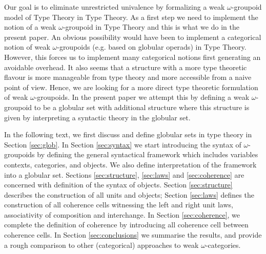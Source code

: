 Our goal is to eliminate unrestricted univalence by formalizing a weak
$\omega$-groupoid model of Type Theory in Type Theory.  As a first
step we need to implement the notion of a weak $\omega$-groupoid in
Type Theory and this is what we do in the present paper.  An obvious
possibility would have been to implement a categorical notion of weak
$\omega$-groupoids (e.g. based on globular operads) in Type
Theory. However, this forces us to implement many categorical notions
first generating an avoidable overhead. It also seems that a structure
with a more type theoretic flavour is more manageable from type theory
and more accessible from a naive point of view. Hence, we are looking
for a more direct type theoretic formulation of weak
$\omega$-groupoids. In the present paper we attempt this by defining a
weak $\omega$-groupoid to be a globular set with additional structure
where this structure is given by interpreting a syntactic theory in
the globular set.

In the following text, we first discuss and define globular sets in
type theory in Section \ref{sec:glob}. In Section \ref{sec:syntax} we
start introducing the syntax of $\omega$-groupoids by defining the general
syntactical framework which includes variables contexts, categories,
and objects. We also define interpretation of the framework into a
globular set. Sections \ref{sec:structure}, \ref{sec:laws} and
\ref{sec:coherence} are concerned with definition of the syntax of
objects. Section \ref{sec:structure} describes the construction of all
units and objects; Section \ref{sec:laws} defines the construction of
all coherence cells witnessing the left and right unit laws,
associativity of composition and interchange. In Section
\ref{sec:coherence}, we complete the definition of coherence by
introducing all coherence cell between coherence cells. In Section
\ref{sec:conclusions}  we summarise the results, and provide a rough
comparison to other (categorical) approaches to weak
$\omega$-categories. 



